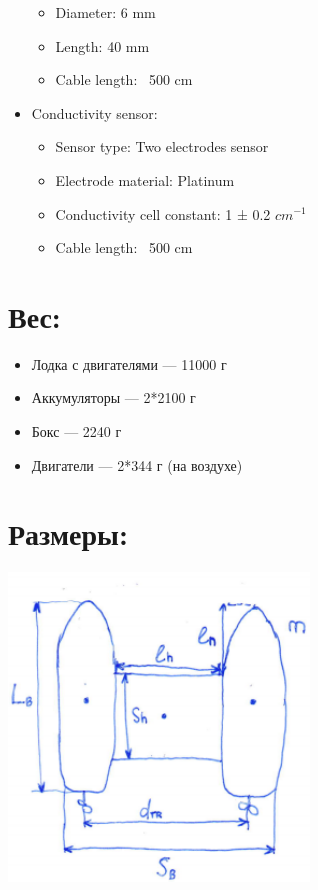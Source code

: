 \begin{itemize}
\begin{itemize}
        \item Diameter: 6 mm
        \item Length: 40 mm
        \item Cable length: ~500 cm
    \end{itemize}
    \item Conductivity sensor: \\
    \begin{itemize}
        \item Sensor type: Two electrodes sensor
        \item Electrode material: Platinum
        \item Conductivity cell constant: 1 ± 0.2 ${cm^{-1}}$
        \item Cable length: ~500 cm
    \end{itemize}
    
\end{itemize}

\section*{Вес:}

\begin{itemize}
    \item Лодка с двигателями --- 11000 г
    \item Аккумуляторы --- 2*2100 г
    \item Бокс --- 2240 г
    \item Двигатели --- 2*344 г (на воздухе)
\end{itemize}

\section*{Размеры:}

\begin{center}
        \includegraphics[width=0.6\textwidth]{img/boat-size.png}\\
\end{center} 
    
